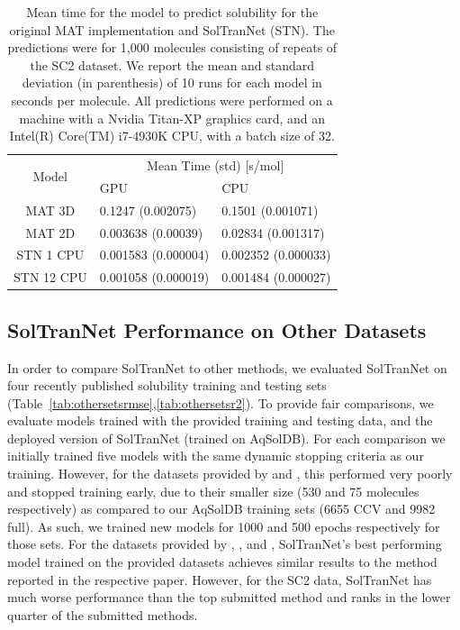 \documentclass[journal=jmcmar,manuscript=article]{achemso}
\begin{document}
\begin{table}
    \begin{tabular}{|c|l|l|}
        \hline
        \multirow{2}{*}{Model}    & \multicolumn{2}{c|}{Mean Time (std) [s/mol]} \\ 
        \cline{2-3}
          &  GPU & CPU \\
         \hline
         MAT 3D & 0.1247 (0.002075) & 0.1501 (0.001071) \\
         MAT 2D & 0.003638 (0.00039) & 0.02834 (0.001317) \\
         STN 1 CPU & 0.001583 (0.000004) & 0.002352 (0.000033)\\
         STN 12 CPU & 0.001058 (0.000019) & 0.001484 (0.000027)\\
         \hline
    \end{tabular}
    \caption{Mean time for the model to predict solubility for the original MAT implementation and SolTranNet (STN). The predictions were for 1,000 molecules consisting of repeats of the SC2 dataset. We report the mean and standard deviation (in parenthesis) of 10 runs for each model in seconds per molecule. All predictions were performed on a machine with a Nvidia Titan-XP graphics card, and an Intel(R) Core(TM) i7-4930K CPU, with a batch size of 32.}
    \label{tab:timings}
\end{table}


\subsection{SolTranNet Performance on Other Datasets}

In order to compare SolTranNet to other methods, we evaluated SolTranNet on four recently published solubility training and testing sets\cite{lovric,boobier,cui,llinas} (Table~\ref{tab:othersetsrmse},\ref{tab:othersetsr2}).
To provide fair comparisons, we evaluate models trained with the provided training and testing data, and the deployed version of SolTranNet (trained on AqSolDB).
For each comparison we initially trained five models with the same dynamic stopping criteria as our training.
However, for the datasets provided by \citet{lovric} and \citet{boobier}, this performed very poorly and stopped training early, due to their smaller size  (530 and 75 molecules respectively) as compared to our AqSolDB training sets (6655 CCV and 9982 full).
As such, we trained new models for 1000 and 500 epochs respectively for those sets.
For the datasets provided by \citet{cui}, \citet{lovric}, and \citet{boobier}, SolTranNet's best performing model trained on the provided datasets achieves similar results to the method reported in the respective paper.
However, for the SC2 data\cite{llinas}, SolTranNet has much worse performance than the top submitted method and ranks in the lower quarter of the submitted methods.
\end{document}
